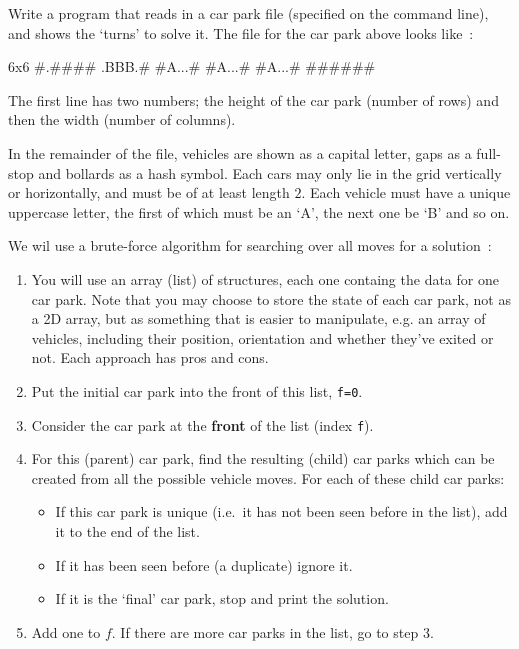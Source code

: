 \begin{exercise}
Write a program that reads in a car park file (specified on the command line), and shows the `turns' to solve it. The file for the car park above looks like~:
\begin{terminaloutput}
6x6
#.####
.BBB.#
#A...#
#A...#
#A...#
######
\end{terminaloutput}

\noindent The first line has two numbers; the height of
the car park (number of rows) and then the width (number of columns).

\noindent
In the remainder of the file, vehicles are shown as a capital letter,
gaps as a full-stop and bollards as a hash symbol. Each cars may only
lie in the grid vertically or horizontally, and must be of at least 
length $2$. Each vehicle must have a unique uppercase letter, the first of which must be an `A', the next one be `B' and so on.

\noindent
We wil use a brute-force algorithm for searching over all moves for a
solution~:
\begin{enumerate}
\item You will use an array (list) of structures, each one containg the data for one car park.
Note that you may choose to store the state of each car park, not as
a 2D array, but as something that is easier to manipulate, e.g. an array
of vehicles, including their position, orientation and whether they've exited or not.
Each approach has pros and cons.
\item Put the initial car park into the front of this list, \verb^f=0^.
\item Consider the car park at the {\bf front} of the list (index \verb$f$).
\item For this (parent) car park, find the resulting (child) car parks 
which can be created from all the possible vehicle moves. For each of these child car parks:
\begin{itemize}
\item If this car park is unique (i.e.\ it has not been seen before in the list), add it to the end of the list.
\item If it has been seen before (a duplicate) ignore it.
\item If it is the `final' car park, stop and print the solution.
\end{itemize}
\item Add one to $f$. If there are more car parks in the list, go to step $3$.
\end{enumerate}


\end{exercise}
